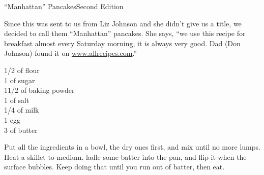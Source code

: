 \begin{entry}{``Manhattan'' Pancakes}{Second Edition}

\begin{open}
  Since this was sent to us from Liz Johnson and she didn't give us a
  title, we decided to call them ``Manhattan'' pancakes. She says, ``we use
  this recipe for breakfast almost every Saturday morning, it is always very
  good. Dad (Don Johnson) found it on \url{www.allrecipes.com}.''
\end{open}
\begin{ingredients}
    \SI{1/2}{\cup} of flour\\
    \SI{1}{\tblspoon} of sugar\\
    1\SI{1/2}{\teaspoon} of baking powder\\
    \SI{1}{\teaspoon} of salt\\
    \SI{1/4}{\cup} of milk\\
    1 egg\\
    \SI{3}{\tblspoon} of butter
\end{ingredients}
Put all the ingredients in a bowl, the dry ones first, and mix until no more
lumps. Heat a skillet to medium. ladle some batter into the pan, and flip it
when the surface bubbles. Keep doing that until you run out of batter, then
eat.
\end{entry}

